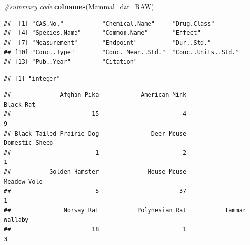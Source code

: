 \documentclass[12pt,]{article}
\newenvironment{Shaded}{\begin{snugshade}}{\end{snugshade}}
\newcommand{\KeywordTok}[1]{\textcolor[rgb]{0.13,0.29,0.53}{\textbf{#1}}}
\newcommand{\CommentTok}[1]{\textcolor[rgb]{0.56,0.35,0.01}{\textit{#1}}}
\newcommand{\OperatorTok}[1]{\textcolor[rgb]{0.81,0.36,0.00}{\textbf{#1}}}
\newcommand{\NormalTok}[1]{#1}
\begin{document}
\begin{Shaded}
\begin{Highlighting}[]
\CommentTok{#summary code}
\KeywordTok{colnames}\NormalTok{(Mammal_dat_RAW)}
\end{Highlighting}
\end{Shaded}

\begin{verbatim}
##  [1] "CAS.No."           "Chemical.Name"     "Drug.Class"       
##  [4] "Species.Name"      "Common.Name"       "Effect"           
##  [7] "Measurement"       "Endpoint"          "Dur..Std."        
## [10] "Conc..Type"        "Conc..Mean..Std."  "Conc..Units..Std."
## [13] "Pub..Year"         "Citation"
\end{verbatim}

\begin{Shaded}
\end{Shaded}

\begin{verbatim}
## [1] "integer"
\end{verbatim}

\begin{Shaded}
\end{Shaded}

\begin{verbatim}
##              Afghan Pika            American Mink                Black Rat 
##                       15                        4                        9 
## Black-Tailed Prairie Dog               Deer Mouse           Domestic Sheep 
##                        1                        2                        1 
##           Golden Hamster              House Mouse              Meadow Vole 
##                        5                       37                        1 
##               Norway Rat           Polynesian Rat           Tammar Wallaby 
##                       18                        1                        3
\end{verbatim}

\begin{Shaded}
\end{Shaded}
\end{document}
